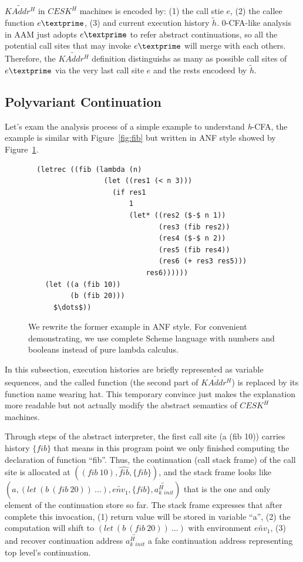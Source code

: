 \documentclass{article}
\begin{document}
$\widetilde{KAddr^H}$ in $CESK^H$ machines is encoded by: (1) the call stie $e$, (2) the callee function $e\textprime$, (3) and current execution history $\tilde{h}$. 0-CFA-like analysis in AAM just adopts $e\textprime$ to refer abstract continuations, so all the potential call sites that may invoke $e\textprime$ will merge with each others. Therefore, the $\widetilde{KAddr^H}$ definition distinguishs as many as possible call sites of $e\textprime$ via the very last call site $e$ and the rests encodeed by $\tilde{h}$.

\subsection{Polyvariant Continuation}
\label{sub:Polyvariant Continuation}
Let's exam the analysis process of a simple example to understand \textit{h}-CFA, the example is similar with Figure~\ref{fig:fib} but written in ANF style showed by Figure~\ref{fig:anf-fib}.

\begin{figure}[h]
\small
\lstset{language=Lisp}
\begin{lstlisting}
  (letrec ((fib (lambda (n)
                  (let ((res1 (< n 3)))
                    (if res1
                        1
                        (let* ((res2 ($-$ n 1))
                               (res3 (fib res2))
                               (res4 ($-$ n 2))
                               (res5 (fib res4))
                               (res6 (+ res3 res5)))
                            res6))))))
    (let ((a (fib 10))
          (b (fib 20)))
      $\dots$))
\end{lstlisting}
\caption{
We rewrite the former example in ANF style.
For convenient  demonstrating, we use complete Scheme language with numbers and booleans instead of pure lambda calculus.
}
\label{fig:anf-fib}
\end{figure}

In this subsection, execution histories are briefly represented as variable sequences, and the called function (the second part of $\widetilde{KAddr^H}$) is replaced by its function name wearing hat. This temporary convince just makes the explanation more readable but not actually modify the abstract semantics of $CESK^H$ machines.

Through steps of the abstract interpreter, the first call site (a (fib 10)) carries history $\{fib\}$ that means in this program point we only finished computing the declaration of function ``fib''.
Thus, the continuation (call stack frame) of the call site is allocated at $((fib\ 10), \widehat{fib}, \{fib\})$, and the stack frame looks like $(a, (let\ (b\ (fib\ 20))\ \dots), \widetilde{env_1}, \{fib\}, \widetilde{a^H_k{}_{init}})$ that is the one and only element of the continuation store so far.
The stack frame expresses that after complete this invocation,
(1) return value will be stored in variable ``a'',
(2) the computation will shift to $(let\ (b\ (fib\ 20))\ \dots)$ with environment $\widetilde{env_1}$,
(3) and recover continuation address $\widetilde{a^H_k{}_{init}}$ a fake continuation address representing top level's continuation.
\end{document}
